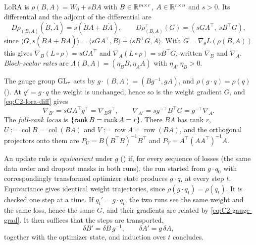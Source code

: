 LoRA is $\rho(B,A)=W_0+sBA$ with $B\in\mathbb{R}^{m\times r}$, $A\in\mathbb{R}^{r\times n}$ and $s>0$. Its differential and the
adjoint of the differential are
\begin{equation}\label{eq:C2-lora-diff}
D\rho_{(B,A)}(\dot B,\dot A)=s(\dot BA+B\dot A),\qquad D\rho_{(B,A)}^\top(G)=(sGA^\top,\ sB^\top G),
\end{equation}
since $\langle G,s(\dot BA+B\dot A)\rangle=\langle sGA^\top,\dot B\rangle+\langle sB^\top G,\dot A\rangle$. With
$G=\nabla_\theta L(\rho(B,A))$ this gives $\nabla_B(L\circ\rho)=sGA^\top$ and $\nabla_A(L\circ\rho)=sB^\top G$, written
$\nabla_B$ and $\nabla_A$. \emph{Block-scalar rates} are $\Lambda(B,A)=(\eta_BB,\eta_AA)$ with $\eta_A,\eta_B>0$.

The gauge group $\mathrm{GL}_r$ acts by $g\cdot(B,A)=(Bg^{-1},gA)$, and $\rho(g\cdot q)=\rho(q)$ (). At
$q'=g\cdot q$ the weight is unchanged, hence so is the weight gradient $G$, and \eqref{eq:C2-lora-diff} gives
\begin{equation}\label{eq:C2-gauge-grad}
\nabla_{B'}=sGA^\top g^\top=\nabla_Bg^\top,\qquad \nabla_{A'}=sg^{-\top}B^\top G=g^{-\top}\nabla_A .
\end{equation}
The \emph{full-rank locus} is $\{\operatorname{rank} B=\operatorname{rank} A=r\}$. There $BA$ has rank $r$, $U:=\operatorname{col}B=\operatorname{col}(BA)$
and $V:=\operatorname{row}A=\operatorname{row}(BA)$, and the orthogonal projectors onto them are
$P_U=B(B^\top B)^{-1}B^\top$ and $P_V=A^\top(AA^\top)^{-1}A$.

An update rule is \emph{equivariant} under $g$ () if, for every sequence of losses (the same data order and
dropout masks in both runs), the run started from $g\cdot q_0$ with correspondingly transformed optimizer state produces
$g\cdot q_t$ at every step $t$. Equivariance gives identical weight trajectories, since $\rho(g\cdot q_t)=\rho(q_t)$. It
is checked one step at a time. If $q_t'=g\cdot q_t$, the two runs see the same weight and the same loss, hence the same
$G$, and their gradients are related by \eqref{eq:C2-gauge-grad}. It then suffices that the steps are transported,
\begin{equation}\label{eq:C2-equivariant-step}
\delta B'=\delta B\,g^{-1},\qquad\delta A'=g\,\delta A,
\end{equation}
together with the optimizer state, and induction over $t$ concludes.

